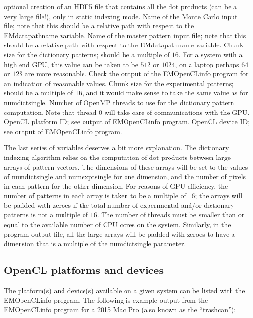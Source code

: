\documentclass[DIV=calc, paper=letter, fontsize=11pt]{scrartcl}	 %
\begin{document}
\begin{itemize}
 optional creation of an HDF5 file that contains all the dot products (can be a very large file!), only in \textsf{static} indexing mode.
 Name of the Monte Carlo input file; note that this should be a relative path with respect to the \textsf{EMdatapathname} variable.
 Name of the master pattern input file; note that this should be a relative path with respect to the \textsf{EMdatapathname} variable.
 Chunk size for the dictionary patterns; should be a multiple of $16$.  For a system with a high end GPU, this value can be taken to be $512$ or $1024$,
on a laptop perhaps $64$ or $128$ are more reasonable.  Check the output of the \textsf{EMOpenCLinfo} program for an indication of reasonable values.
 Chunk size for the experimental patterns; should be a multiple of $16$, and it would make sense to take the same value as for \textsf{numdictsingle}.
 Number of OpenMP threads to use for the dictionary pattern computation.  Note that thread $0$ will take care of communications with the GPU.
 OpenCL platform ID; see output of \textsf{EMOpenCLinfo} program.
 OpenCL device ID; see output of \textsf{EMOpenCLinfo} program.
\end{itemize}
The last series of variables deserves a bit more explanation.  The dictionary indexing algorithm relies on the computation of dot products between large arrays of pattern vectors.
The dimensions of these arrays will be set to the values of \textsf{numdictsingle} and \textsf{numexptsingle} for one dimension, and the number of pixels in each pattern for the 
other dimension. For reasons of GPU efficiency, the number of patterns in each array is taken to be a multiple of $16$; the arrays will be padded with zeroes if the total 
number of experimental and/or dictionary patterns is not a multiple of $16$.  The number of threads must be smaller than or equal to the available number of CPU cores on the system.
Similarly, in the program output file, all the large arrays will be padded with zeroes to have a dimension that is a multiple of the \textsf{numdictsingle} parameter.

\subsection{OpenCL platforms and devices}
The platform(s) and device(s) available on a given system can be listed with the \textsf{EMOpenCLinfo} program.
The following is example output from the \textsf{EMOpenCLinfo} program for a 2015 Mac Pro (also known as the ``trashcan''):
\end{document}
